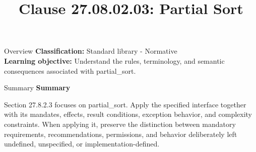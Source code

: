 \documentclass[10pt,letterpaper]{article}
\title{Clause 27.08.02.03: Partial Sort}
\author{}
\date{}
\begin{document}
\maketitle
\begin{CornellOverviewBox}{Overview}
\textbf{Classification:} Standard library - Normative\\[2pt]
\textbf{Learning objective:} Understand the rules, terminology, and semantic consequences associated with partial\_sort.
\end{CornellOverviewBox}\begin{CornellSummaryBox}{Summary}
{\sffamily\bfseries\color{Accent} Summary}\par\vspace{3pt}Section 27.8.2.3 focuses on partial\_sort. Apply the specified interface together with its mandates, effects, result conditions, exception behavior, and complexity constraints. When applying it, preserve the distinction between mandatory requirements, recommendations, permissions, and behavior deliberately left undefined, unspecified, or implementation-defined.
\end{CornellSummaryBox}
\end{document}
